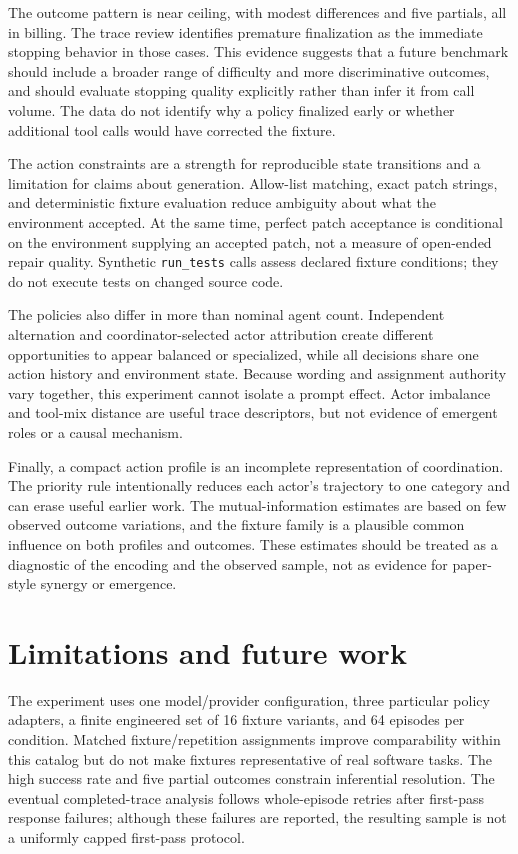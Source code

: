 \documentclass[pdflatex,sn-basic,Numbered]{sn-jnl}
\begin{document}
The outcome pattern is near ceiling, with modest differences and five partials, all in billing. The trace review identifies premature finalization as the immediate stopping behavior in those cases. This evidence suggests that a future benchmark should include a broader range of difficulty and more discriminative outcomes, and should evaluate stopping quality explicitly rather than infer it from call volume. The data do not identify why a policy finalized early or whether additional tool calls would have corrected the fixture.

The action constraints are a strength for reproducible state transitions and a limitation for claims about generation. Allow-list matching, exact patch strings, and deterministic fixture evaluation reduce ambiguity about what the environment accepted. At the same time, perfect patch acceptance is conditional on the environment supplying an accepted patch, not a measure of open-ended repair quality. Synthetic \texttt{run\_tests} calls assess declared fixture conditions; they do not execute tests on changed source code.

The policies also differ in more than nominal agent count. Independent alternation and coordinator-selected actor attribution create different opportunities to appear balanced or specialized, while all decisions share one action history and environment state. Because wording and assignment authority vary together, this experiment cannot isolate a prompt effect. Actor imbalance and tool-mix distance are useful trace descriptors, but not evidence of emergent roles or a causal mechanism.

Finally, a compact action profile is an incomplete representation of coordination. The priority rule intentionally reduces each actor's trajectory to one category and can erase useful earlier work. The mutual-information estimates are based on few observed outcome variations, and the fixture family is a plausible common influence on both profiles and outcomes. These estimates should be treated as a diagnostic of the encoding and the observed sample, not as evidence for paper-style synergy or emergence.

\section{Limitations and future work}

The experiment uses one model/provider configuration, three particular policy adapters, a finite engineered set of 16 fixture variants, and 64 episodes per condition. Matched fixture/repetition assignments improve comparability within this catalog but do not make fixtures representative of real software tasks. The high success rate and five partial outcomes constrain inferential resolution. The eventual completed-trace analysis follows whole-episode retries after first-pass response failures; although these failures are reported, the resulting sample is not a uniformly capped first-pass protocol.
\end{document}
